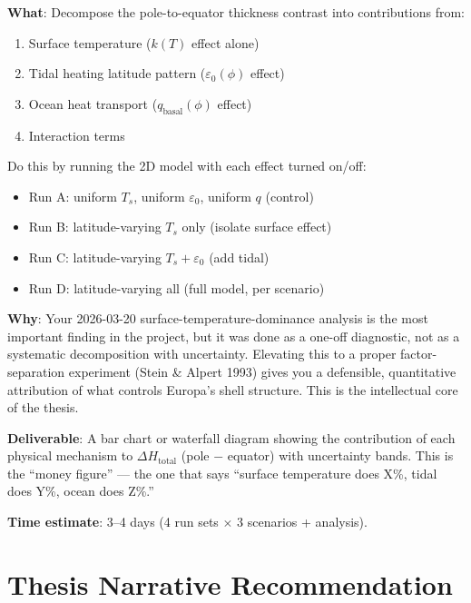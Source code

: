 \documentclass[11pt,a4paper]{article}
\begin{document}
\begin{actionbox}
\textbf{What}: Decompose the pole-to-equator thickness contrast into
contributions from:
\begin{enumerate}[leftmargin=1.5em]
\item Surface temperature ($k(T)$ effect alone)
\item Tidal heating latitude pattern ($\varepsilon_0(\phi)$ effect)
\item Ocean heat transport ($q_\mathrm{basal}(\phi)$ effect)
\item Interaction terms
\end{enumerate}

Do this by running the 2D model with each effect turned on/off:
\begin{itemize}[leftmargin=1.5em]
\item Run A: uniform $T_s$, uniform $\varepsilon_0$, uniform $q$ (control)
\item Run B: latitude-varying $T_s$ only (isolate surface effect)
\item Run C: latitude-varying $T_s + \varepsilon_0$ (add tidal)
\item Run D: latitude-varying all (full model, per scenario)
\end{itemize}

\textbf{Why}: Your 2026-03-20 surface-temperature-dominance analysis is
the most important finding in the project, but it was done as a one-off
diagnostic, not as a systematic decomposition with uncertainty. Elevating
this to a proper factor-separation experiment (Stein \& Alpert 1993) gives
you a defensible, quantitative attribution of what controls Europa's shell
structure. This is the intellectual core of the thesis.

\textbf{Deliverable}: A bar chart or waterfall diagram showing the
contribution of each physical mechanism to $\Delta H_\mathrm{total}$
(pole $-$ equator) with uncertainty bands. This is the ``money figure'' ---
the one that says ``surface temperature does X\%, tidal does Y\%, ocean
does Z\%.''

\textbf{Time estimate}: 3--4 days (4 run sets $\times$ 3 scenarios + analysis).
\end{actionbox}

\section{Thesis Narrative Recommendation}
\end{document}
